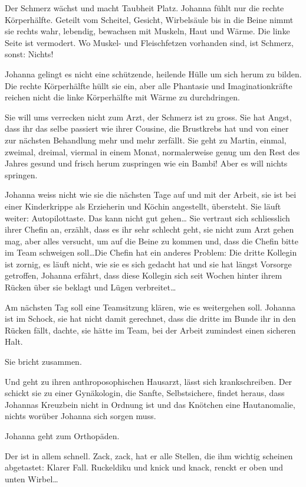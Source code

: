 \documentclass[10pt,titlepage,a5paper]{book}
\begin{document}
Der Schmerz wächst  und macht Taubheit Platz. Johanna fühlt nur die rechte Körperhälfte. Geteilt vom Scheitel, Gesicht, Wirbelsäule bis in die Beine nimmt sie rechts wahr, lebendig, bewachsen mit Muskeln, Haut und Wärme. Die linke Seite ist vermodert. Wo Mus\-kel- und Fleischfetzen vorhanden sind, ist Schmerz, sonst: Nichts! 

Johanna gelingt es nicht eine schützende, heilende Hülle um sich herum zu bilden. Die rechte Körperhälfte hüllt sie ein, aber alle Phantasie und Imaginationkräfte reichen nicht die linke Körper\-hälfte mit Wärme zu durchdringen.

Sie will ums verrecken nicht zum Arzt, der Schmerz ist zu gross. Sie hat Angst, dass ihr das selbe passiert wie ihrer Cousine, die Brustkrebs hat und von einer zur nächsten Behandlung mehr und mehr zerfällt.
Sie geht zu Martin, einmal, zweimal, dreimal, viermal in einem Monat, normalerweise genug um den Rest des Jahres gesund und frisch herum zuspringen wie ein Bambi! Aber es will nichts springen.

Johanna weiss nicht wie sie die nächsten Tage auf und mit der Arbeit, sie ist bei einer Kinderkrippe als Erzieherin und Köchin angestellt, übersteht. Sie läuft weiter: Autopilottaste. Das kann nicht gut gehen\dots 
Sie vertraut sich schliesslich ihrer Chefin an, erzählt, dass es ihr sehr schlecht geht, sie nicht zum Arzt gehen mag, aber alles versucht, um auf die Beine zu kommen und, dass die Chefin bitte im Team schweigen soll\dots  Die Chefin hat ein anderes Problem: Die dritte Kollegin ist zornig, es läuft nicht, wie sie es sich gedacht hat und sie hat längst Vorsorge getroffen, Johanna erfährt, dass diese Kollegin sich seit Wochen hinter ihrem Rücken über sie beklagt und Lügen verbreitet\dots 

Am nächsten Tag soll eine Teamsitzung klären, wie es weitergehen soll.
Johanna ist im Schock, sie hat nicht damit gerechnet, dass die dritte im Bunde ihr in den Rücken fällt, dachte, sie hätte im Team, bei der Arbeit zumindest einen sicheren Halt.

Sie bricht zusammen. 

Und geht zu ihren anthroposophischen Hausarzt, lässt sich krankschreiben. Der schickt sie zu einer Gynäkologin, die Sanfte, Selbstsichere, findet heraus, dass Johannas Kreuzbein nicht in Ordnung ist und das Knötchen eine Hautanomalie, nichts worüber Johanna sich sorgen muss.

Johanna geht zum Orthopäden.

Der ist in allem schnell. Zack, zack, hat er alle Stellen, die ihm wichtig scheinen abgetastet: Klarer Fall. Ruckeldiku und knick und knack, renckt er oben und unten Wirbel\dots
\end{document}
